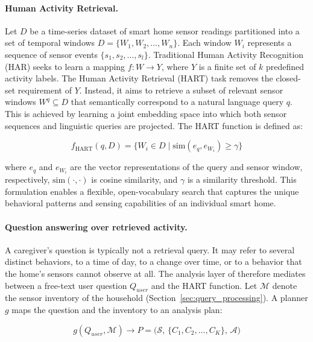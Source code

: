 \paragraph{Human Activity Retrieval.}
Let $D$ be a time-series dataset of smart home sensor readings partitioned into a set of temporal windows $D = \{W_1, W_2, \dots, W_n\}$. Each window $W_i$ represents a sequence of sensor events $\{s_1, s_2, \dots, s_l\}$. Traditional Human Activity Recognition (HAR) seeks to learn a mapping $f: W \to Y$, where $Y$ is a finite set of $k$ predefined activity labels.
The Human Activity Retrieval (HART) task removes the closed-set requirement of $Y$. Instead, it aims to retrieve a subset of relevant sensor windows $W^q \subseteq D$ that semantically correspond to a natural language query $q$. This is achieved by learning a joint embedding space into which both sensor sequences and linguistic queries are projected. The HART function is defined as:

\begin{equation}
f_{\text{HART}}(q, D) = \{ W_i \in D \mid \text{sim}(e_{q}, e_{W_i}) \geq \gamma \}
\label{eq:hart}
\end{equation}

where $e_q$ and $e_{W_i}$ are the vector representations of the query and sensor window, respectively, $\text{sim}(\cdot,\cdot)$ is cosine similarity, and $\gamma$ is a similarity threshold. This formulation enables a flexible, open-vocabulary search that captures the unique behavioral patterns and sensing capabilities of an individual smart home.

\paragraph{Question answering over retrieved activity.}
A caregiver's question is typically not a retrieval query. It may refer to several distinct behaviors, to a time of day, to a change over time, or to a behavior that the home's sensors cannot observe at all. The analysis layer of \ToolName therefore mediates between a free-text user question $Q_{user}$ and the HART function. Let $\mathcal{M}$ denote the sensor inventory of the household (Section~\ref{sec:query_processing}). A planner $g$ maps the question and the inventory to an analysis plan:

\begin{equation}
g(Q_{user}, \mathcal{M}) \to P = \big(\mathcal{S},\, \{C_1, C_2, \dots, C_K\},\, \mathcal{A}\big)
\end{equation}

